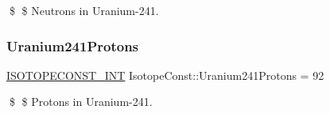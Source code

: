 \$ \$ Neutrons in Uranium-\/241. \mbox{\label{group___isotope_const-_uranium-_u241_gae603880b32da8b90e0321739f7c504c9}} 
\subsubsection{\texorpdfstring{Uranium241\+Protons}{Uranium241Protons}}
{\footnotesize\ttfamily \mbox{\hyperlink{group___isotope_const-_macros_ga5f18360b3e99483a35c32d789e62621c}{I\+S\+O\+T\+O\+P\+E\+C\+O\+N\+S\+T\+\_\+\+I\+NT}} Isotope\+Const\+::\+Uranium241\+Protons = 92}

\$ \$ Protons in Uranium-\/241. 